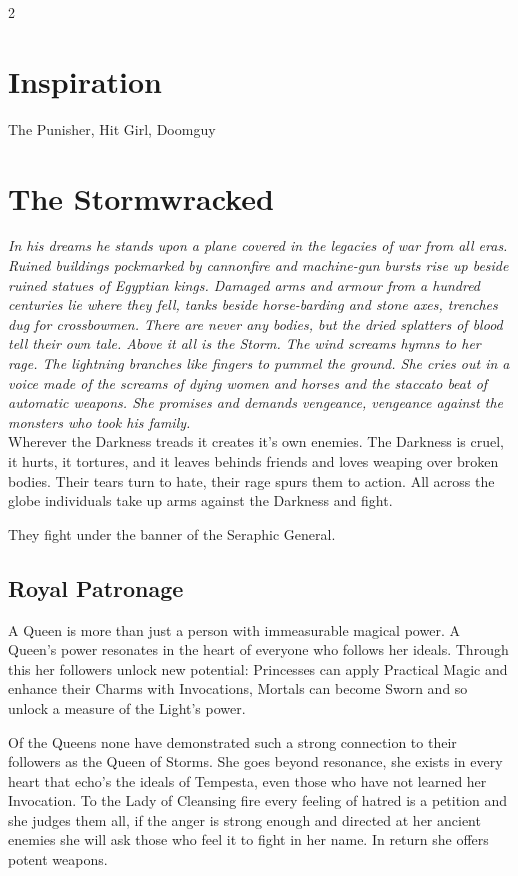 \begin{multicols}{2}
\section*{Inspiration}
The Punisher, Hit Girl, Doomguy 

\section*{The Stormwracked}
\label{sec:Stormwracked}

\textit{In his dreams he stands upon a plane covered in the legacies of war from all eras. Ruined buildings pockmarked by cannonfire and machine-gun bursts rise up beside ruined statues of Egyptian kings. Damaged arms and armour from a hundred centuries lie where they fell, tanks beside horse-barding and stone axes, trenches dug for crossbowmen. There are never any bodies, but the dried splatters of blood tell their own tale. Above it all is the Storm. The wind screams hymns to her rage. The lightning branches like fingers to pummel the ground. She cries out in a voice made of the screams of dying women and horses and the staccato beat of automatic weapons. She promises and demands vengeance, vengeance against the monsters who took his family. }\\

\noindent Wherever the Darkness treads it creates it's own enemies. The Darkness is cruel, it hurts, it tortures, and it leaves behinds friends and loves weaping over broken bodies. Their tears turn to hate, their rage spurs them to action. All across the globe individuals take up arms against the Darkness and fight.

They fight under the banner of the Seraphic General.

\subsection*{Royal Patronage}

A Queen is more than just a person with immeasurable magical power. A Queen's power resonates in the heart of everyone who follows her ideals. Through this her followers unlock new potential: Princesses can apply Practical Magic and enhance their Charms with Invocations, Mortals can become Sworn and so unlock a measure of the Light's power.

Of the Queens none have demonstrated such a strong connection to their followers as the Queen of Storms. She goes beyond resonance, she exists in every heart that echo's the ideals of Tempesta, even those who have not learned her Invocation. To the Lady of Cleansing fire every feeling of hatred is a petition and she judges them all, if the anger is strong enough and directed at her ancient enemies she will ask those who feel it to fight in her name. In return she offers potent weapons.


\end{multicols}

